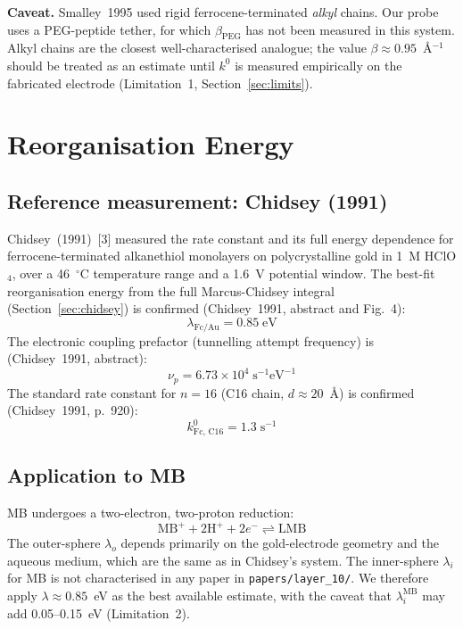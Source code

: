 \documentclass[10pt,a4paper]{article}
\numberwithin{equation}{section}
\newcommand{\cit}[1]{[#1]}
\begin{document}
\noindent\textbf{Caveat.} Smalley~1995 used rigid ferrocene-terminated
\textit{alkyl} chains. Our probe uses a PEG-peptide tether, for which
$\beta_{\text{PEG}}$ has not been measured in this system. Alkyl chains
are the closest well-characterised analogue; the value $\beta \approx
0.95$~\AA$^{-1}$ should be treated as an estimate until $k^0$ is
measured empirically on the fabricated electrode (Limitation~1,
Section~\ref{sec:limits}).

\section{Reorganisation Energy}
\label{sec:lambda}

\subsection{Reference measurement: Chidsey (1991)}

Chidsey~(1991)~\cit{3} measured the rate constant and its full energy
dependence for ferrocene-terminated alkanethiol monolayers on
polycrystalline gold in 1~M HClO$_4$, over a 46~$^\circ$C temperature
range and a 1.6~V potential window. The best-fit reorganisation energy
from the full Marcus-Chidsey integral (Section~\ref{sec:chidsey}) is
confirmed (Chidsey~1991, abstract and Fig.~4):
\begin{equation}
  \lambda_{\text{Fc/Au}} = 0.85\;\text{eV}
  \label{eq:lambdaFc}
\end{equation}
The electronic coupling prefactor (tunnelling attempt frequency) is
(Chidsey~1991, abstract):
\begin{equation}
  \nu_p = 6.73 \times 10^4\;\text{s}^{-1}\text{eV}^{-1}
  \label{eq:nup}
\end{equation}
The standard rate constant for $n = 16$ (C16 chain, $d \approx 20$~\AA)
is confirmed (Chidsey~1991, p.~920):
\begin{equation}
  k^0_{\text{Fc, C16}} = 1.3\;\text{s}^{-1}
  \label{eq:k0Fc}
\end{equation}

\subsection{Application to MB}

MB undergoes a two-electron, two-proton reduction:
\begin{equation}
  \text{MB}^+ + 2\text{H}^+ + 2e^- \rightleftharpoons \text{LMB}
  \label{eq:MBredn}
\end{equation}
The outer-sphere $\lambda_o$ depends primarily on the gold-electrode
geometry and the aqueous medium, which are the same as in Chidsey's
system. The inner-sphere $\lambda_i$ for MB is not characterised in any
paper in \texttt{papers/layer\_10/}. We therefore apply
$\lambda \approx 0.85$~eV as the best available estimate, with the
caveat that $\lambda_i^{\text{MB}}$ may add 0.05--0.15~eV (Limitation~2).
\end{document}
